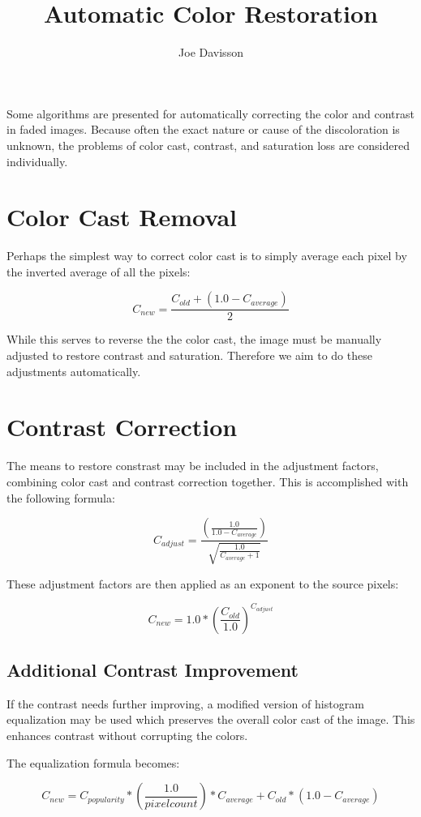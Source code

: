 \documentclass{article}
\title{Automatic Color Restoration}
\author{Joe Davisson} %
\begin{document}
\maketitle

Some algorithms are presented for automatically correcting the
color and contrast in faded images. Because often the exact nature or cause
of the discoloration is unknown, the problems of color cast, contrast, and
saturation loss are considered individually.

\section{Color Cast Removal}
Perhaps the simplest way to correct color cast is to simply average each
pixel by the inverted average of all the pixels:

\[ C_{new} = \frac{C_{old} + \left(1.0 - C_{average}\right) }{2} \]

While this serves to reverse the the color cast, the image must be manually
adjusted to restore contrast and saturation. Therefore we aim to do these
adjustments automatically.

\section{Contrast Correction}
The means to restore constrast may be included in the adjustment factors,
combining color cast and contrast correction together. This is accomplished
with the following formula:

\[ C_{adjust} = \frac{\left(\frac{1.0} {1.0 - C_{average}}\right)}
                     {\sqrt{\frac{1.0} { C_{average} + 1}}} \]

These adjustment factors are then applied as an exponent to the source pixels:

\[ C_{new} = 1.0 * \left(\frac{ C_{old}}{1.0}\right) ^ {C_{adjust}} \]

\subsection{Additional Contrast Improvement}
If the contrast needs further improving, a modified version of histogram
equalization may be used which preserves the overall color cast of the image.
This enhances contrast without corrupting the colors.

The equalization formula becomes:

\[ C_{new} = C_{popularity} * \left(\frac{1.0}{pixel count}\right) * C_{average}
                   + C_{old} * \left(1.0 - C_{average}\right) \]
\end{document}
